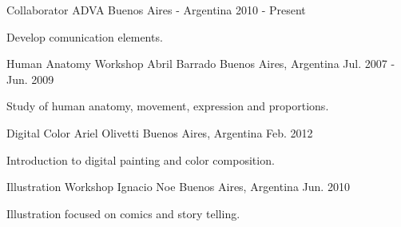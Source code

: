 

\begin{cventries}

  \cventry
    {Collaborator} %
    {ADVA} %
    {Buenos Aires - Argentina} %
    {2010 - Present} %
    {
      \begin{cvitems} %
        \item {Develop comunication elements.}
      \end{cvitems}
    }


  \cventry
    {Human Anatomy Workshop} %
    {Abril Barrado} %
    {Buenos Aires, Argentina} %
    {Jul. 2007 - Jun. 2009} %
    {
      \begin{cvitems}
        Study of human anatomy, movement, expression and proportions.
      \end{cvitems}
    }

  \cventry
    {Digital Color} %
    {Ariel Olivetti} %
    {Buenos Aires, Argentina} %
    {Feb. 2012} %
    {
      \begin{cvitems}
        Introduction to digital painting and color composition.
      \end{cvitems}
    }

  \cventry
    {Illustration Workshop} %
    {Ignacio Noe} %
    {Buenos Aires, Argentina} %
    {Jun. 2010} %
    {
      \begin{cvitems}
        Illustration focused on comics and story telling.
      \end{cvitems}
    }


\end{cventries}
